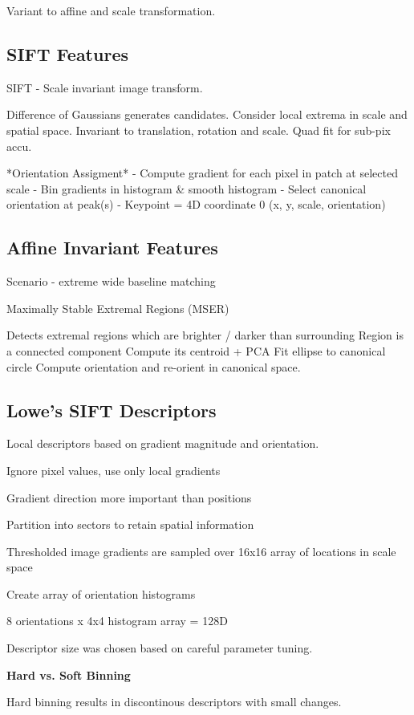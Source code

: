 Variant to affine and scale transformation.

\subsection{SIFT Features}

SIFT - Scale invariant image transform.

Difference of Gaussians generates candidates. 
Consider local extrema in scale and spatial space.
Invariant to translation, rotation and scale.
Quad fit for sub-pix accu.

*Orientation Assigment*
- Compute gradient for each pixel in patch at selected scale
- Bin gradients in histogram \& smooth histogram
- Select canonical orientation at peak(s)
- Keypoint = 4D coordinate 0 (x, y, scale, orientation)

\subsection{Affine Invariant Features}
Scenario - extreme wide baseline matching

Maximally Stable Extremal Regions (MSER)

Detects extremal regions which are brighter / darker than surrounding
Region is a connected component
Compute its centroid + PCA
Fit ellipse to canonical circle
Compute orientation and re-orient in canonical space.

\subsection{Lowe's SIFT Descriptors}

Local descriptors based on gradient magnitude and orientation.

Ignore pixel values, use only local gradients

Gradient direction more important than positions

Partition into sectors to retain spatial information

Thresholded image gradients are sampled over 16x16 array of locations in scale space

Create array of orientation histograms

8 orientations x 4x4 histogram array = 128D

Descriptor size was chosen based on careful parameter tuning. 


\textbf{Hard vs. Soft Binning}

Hard binning results in discontinous descriptors with small changes.

